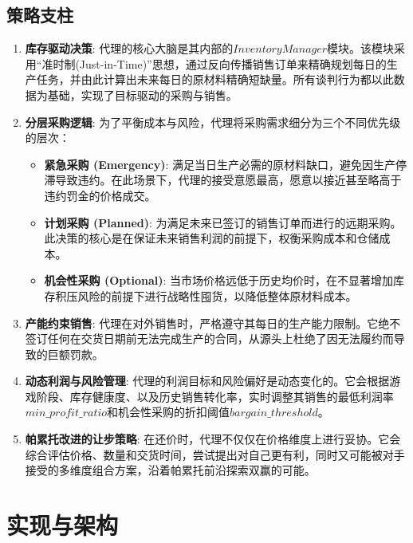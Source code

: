 \documentclass[12pt, a4paper]{article}
\begin{document}
\subsection{策略支柱}
\begin{enumerate}
    \item \textbf{库存驱动决策}: 代理的核心大脑是其内部的$InventoryManager$模块。该模块采用“准时制(Just-in-Time)”思想，通过反向传播销售订单来精确规划每日的生产任务，并由此计算出未来每日的原材料精确短缺量。所有谈判行为都以此数据为基础，实现了目标驱动的采购与销售。

    \item \textbf{分层采购逻辑}: 为了平衡成本与风险，代理将采购需求细分为三个不同优先级的层次：
        \begin{itemize}
            \item \textbf{紧急采购 (Emergency)}: 满足当日生产必需的原材料缺口，避免因生产停滞导致违约。在此场景下，代理的接受意愿最高，愿意以接近甚至略高于违约罚金的价格成交。
            \item \textbf{计划采购 (Planned)}: 为满足未来已签订的销售订单而进行的远期采购。此决策的核心是在保证未来销售利润的前提下，权衡采购成本和仓储成本。
            \item \textbf{机会性采购 (Optional)}: 当市场价格远低于历史均价时，在不显著增加库存积压风险的前提下进行战略性囤货，以降低整体原材料成本。
        \end{itemize}

    \item \textbf{产能约束销售}: 代理在对外销售时，严格遵守其每日的生产能力限制。它绝不签订任何在交货日期前无法完成生产的合同，从源头上杜绝了因无法履约而导致的巨额罚款。%

    \item \textbf{动态利润与风险管理}: 代理的利润目标和风险偏好是动态变化的。它会根据游戏阶段、库存健康度、以及历史销售转化率，实时调整其销售的最低利润率$min\_profit\_ratio$和机会性采购的折扣阈值$bargain\_threshold$。

    \item \textbf{帕累托改进的让步策略}: 在还价时，代理不仅仅在价格维度上进行妥协。它会综合评估价格、数量和交货时间，尝试提出对自己更有利，同时又可能被对手接受的多维度组合方案，沿着帕累托前沿探索双赢的可能。
\end{enumerate}

\section{实现与架构}
\end{document}

